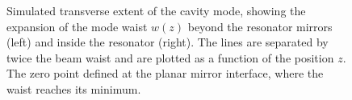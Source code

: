 \documentclass[../Thesis-IJspeert.tex]{subfiles}
\begin{document}
\begin{figure}[t]
\caption[Simulated transverse extent of the cavity mode]{Simulated transverse extent of the cavity mode, showing the expansion of the mode waist $w(z)$ beyond the resonator mirrors (left) and inside the resonator (right). The lines are separated by twice the beam waist and are plotted as a function of the position $z$. The zero point defined at the planar mirror interface, where the waist reaches its minimum.}
\label{modeexpansion} 
\end{figure}
\end{document}
